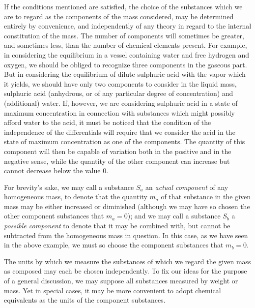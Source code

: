 \documentclass[12pt]{article}
\begin{document}
If the conditions mentioned are satisfied, the choice of the substances which we are to regard as the components of the mass considered, may be determined entirely by convenience, and independently of any theory in regard to the internal constitution of the mass. The number of components will sometimes be greater, and sometimes less, than the number of chemical elements present. For example, in considering the equilibrium in a vessel containing water and free hydrogen and oxygen, we should be obliged to recognize three components in the gaseous part. But in considering the equilibrium of dilute sulphuric acid with the vapor which it yields, we should have only two components to consider in the liquid mass, sulphuric acid (anhydrous, or of any particular degree of concentration) and (additional) water. If, however, we are considering sulphuric acid in a state of maximum concentration in connection with substances which might possibly afford water to the acid, it must be noticed that the condition of the independence of the differentials will require that we consider the acid in the state of maximum concentration as one of the components. The quantity of this component will then be capable of variation both in the positive and in the negative sense, while the quantity of the other component can increase but cannot decrease below the value 0.

For brevity's sake, we may call a substance $S_a$ an \textit{actual component} of any homogeneous mass, to denote that the quantity $m_a$ of that substance in the given mass may be either increased or diminished (although we may have so chosen the other component substances that $m_a=0$); and we may call a substance $S_b$ a \textit{possible component} to denote that it may be combined with, but cannot be subtracted from the homogeneous mass in question. In this case, as we have seen in the above example, we must so choose the component substances that $m_b =0$.

The units by which we measure the substances of which we regard the given mass as composed may each be chosen independently. To fix our ideas for the purpose of a general discussion, we may suppose all substances measured by weight or mass. Yet in special cases, it may be more convenient to adopt chemical equivalents as the units of the component substances.
\end{document}
